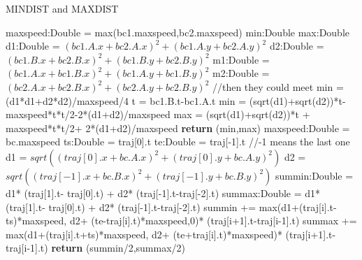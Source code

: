 \documentclass[sigplan]{acmart}
\begin{document}
\begin{algorithm}
\caption{MINDIST and MAXDIST} \label{alg:minmax}
\begin{algorithmic}[1]
    \State maxspeed:Double = max(bc1.maxspeed,bc2.maxspeed)
    \State min:Double
    \State max:Double
    \State d1:Double = $(bc1.A.x+bc2.A.x)^2+(bc1.A.y+bc2.A.y)^2$
    \State d2:Double = $(bc1.B.x+bc2.B.x)^2+(bc1.B.y+bc2.B.y)^2$
    \State m1:Double = $(bc1.A.x+bc1.B.x)^2+(bc1.A.y+bc1.B.y)^2$
    \State m2:Double = $(bc2.A.x+bc2.B.x)^2+(bc2.A.y+bc2.B.y)^2$
     //then they could meet
        \State min = (d1*d1+d2*d2)/maxspeed/4
    \Else
        \State t = bc1.B.t-bc1.A.t
        \State min = (sqrt(d1)+sqrt(d2))*t-maxspeed*t*t/2-2*(d1+d2)/maxspeed
    \EndIf
    \State max = (sqrt(d1)+sqrt(d2))*t + maxspeed*t*t/2+ 2*(d1+d2)/maxspeed
    \State \textbf{return} (min,max)
\EndFunction
{}
    \State maxspeed:Double = bc.maxspeed
    \State ts:Double = traj[0].t
    \State te:Double = traj[-1].t //-1 means the last one
    \State d1 = $sqrt((traj[0].x+bc.A.x)^2+(traj[0].y+bc.A.y)^2)$
    \State d2 = $sqrt((traj[-1].x+bc.B.x)^2+(traj[-1].y+bc.B.y)^2)$
    \State summin:Double = d1* (traj[1].t- traj[0].t) + d2* (traj[-1].t-traj[-2].t)
    \State summax:Double = d1* (traj[1].t- traj[0].t) + d2* (traj[-1].t-traj[-2].t)
        \State summin += max(d1+(traj[i].t-ts)*maxspeed, d2+ (te-traj[i].t)*maxspeed,0)* (traj[i+1].t-traj[i-1].t)
        \State summax += max(d1+(traj[i].t+ts)*maxspeed, d2+ (te+traj[i].t)*maxspeed)* (traj[i+1].t-traj[i-1].t)
    \EndFor
    \State \textbf{return} (summin/2,summax/2)
\EndFunction
\end{algorithmic}
\end{algorithm}
\end{document}
